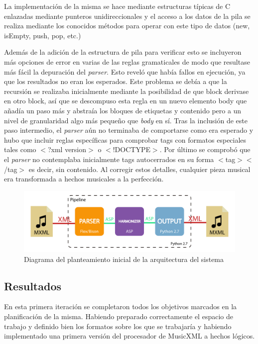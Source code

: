 La implementación de la misma se hace mediante estructuras típicas de C enlazadas mediante punteros unidireccionales y el acceso a los datos de la pila se realiza mediante los conocidos métodos para operar con este tipo de datos (new, isEmpty, push, pop, etc.) 

Además de la adición de la estructura de pila para verificar esto se incluyeron más opciones de error en varias de las reglas gramaticales de modo que resultase más fácil la depuración del \textit{parser}. Esto reveló que había fallos en ejecución, ya que los resultados no eran los esperados. Este problema se debía a que la recursión se realizaba inicialmente mediante la posibilidad de que block derivase en otro block, así que se descompuso esta regla en un nuevo elemento body que añadía un paso más y abstraía los bloques de etiquetas y contenido pero a un nivel de granularidad algo más pequeño que \textit{body} en sí. Tras la inclusión de este paso intermedio, el \textit{parser} aún no terminaba de comportarse como era esperado y hubo que incluir reglas específicas para comprobar tags con formatos especiales tales como $<$?xml version$>$ o $<$!DOCTYPE$>$. Por último se comprobó que el \textit{parser} no contemplaba inicialmente tags autocerrados en su forma $<$tag$>$$<$/tag$>$ es decir, sin contenido. Al corregir estos detalles, cualquier pieza musical era transformada a hechos musicales a la perfección.

\begin{figure}
	\centering
	\includegraphics[width=0.8\linewidth]{imagenes/arquitectura_inicial.pdf}
	\caption{Diagrama del planteamiento inicial de la arquitectura del sistema}
	\label{fig:arquitectura_inicial}
\end{figure}

\subsection{Resultados}
En esta primera iteración se completaron todos los objetivos marcados en la planificación de la misma. Habiendo preparado correctamente el espacio de trabajo y definido bien los formatos sobre los que se trabajaría y habiendo implementado una primera versión del procesador de MusicXML a hechos lógicos.

